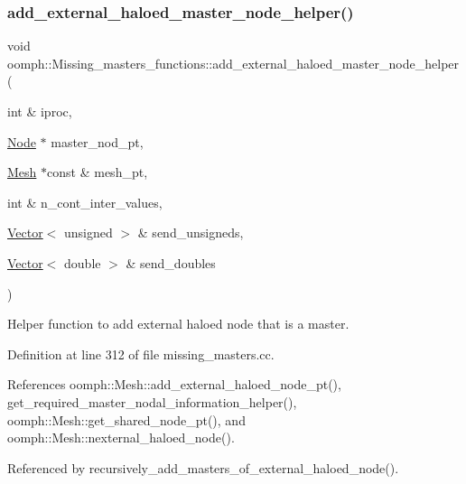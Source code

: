 \subsubsection{\texorpdfstring{add\+\_\+external\+\_\+haloed\+\_\+master\+\_\+node\+\_\+helper()}{add\_external\_haloed\_master\_node\_helper()}}
{\footnotesize\ttfamily void oomph\+::\+Missing\+\_\+masters\+\_\+functions\+::add\+\_\+external\+\_\+haloed\+\_\+master\+\_\+node\+\_\+helper (\begin{DoxyParamCaption}\item[{int \&}]{iproc,  }\item[{\hyperlink{classoomph_1_1Node}{Node} $\ast$}]{master\+\_\+nod\+\_\+pt,  }\item[{\hyperlink{classoomph_1_1Mesh}{Mesh} $\ast$const \&}]{mesh\+\_\+pt,  }\item[{int \&}]{n\+\_\+cont\+\_\+inter\+\_\+values,  }\item[{\hyperlink{classoomph_1_1Vector}{Vector}$<$ unsigned $>$ \&}]{send\+\_\+unsigneds,  }\item[{\hyperlink{classoomph_1_1Vector}{Vector}$<$ double $>$ \&}]{send\+\_\+doubles }\end{DoxyParamCaption})}



Helper function to add external haloed node that is a master. 



Definition at line 312 of file missing\+\_\+masters.\+cc.



References oomph\+::\+Mesh\+::add\+\_\+external\+\_\+haloed\+\_\+node\+\_\+pt(), get\+\_\+required\+\_\+master\+\_\+nodal\+\_\+information\+\_\+helper(), oomph\+::\+Mesh\+::get\+\_\+shared\+\_\+node\+\_\+pt(), and oomph\+::\+Mesh\+::nexternal\+\_\+haloed\+\_\+node().



Referenced by recursively\+\_\+add\+\_\+masters\+\_\+of\+\_\+external\+\_\+haloed\+\_\+node().

\mbox{\label{namespaceoomph_1_1Missing__masters__functions_a6034e2c1c81a56272efd35886b2a9543}} 
